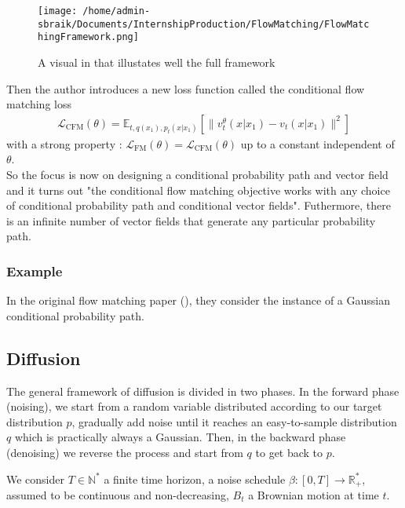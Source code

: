 \documentclass{article}
\begin{document}
\begin{figure}[h]
  \centering
  \texttt{[image: /home/admin-sbraik/Documents/InternshipProduction/FlowMatching/FlowMatchingFramework.png]}
  \caption{A visual in \cite{lipman2024flowmatchingguidecode} that illustates well the full framework}
  \label{fig:flow_matching_framework}
\end{figure}

Then the author introduces a new loss function called the conditional flow matching loss
\begin{align}
  \mathcal{L}_\text{CFM}(\theta) = \mathbb{E}_{t,q(x_1),p_t(x|x_1)}\left[\|v_t^\theta(x|x_1)-v_t(x|x_1)\|^2\right]
\end{align}
with a strong property : \(\mathcal{L}_\text{FM}(\theta)=\mathcal{L}_\text{CFM}(\theta)\) up to a constant independent of \(\theta\). \\
So the focus is now on designing a conditional probability path and vector field and it turns out "the conditional flow matching objective works with any choice of conditional probability path and conditional vector fields". Futhermore, there is an infinite number of vector fields that generate any particular probability path.\\



\subsubsection{Example}
In the original flow matching paper (\cite{lipman2023flowmatchinggenerativemodeling}), they consider the instance of a Gaussian conditional probability path.

\subsection{Diffusion}
The general framework of diffusion is divided in two phases. In the forward phase (noising), we start from a random variable distributed according to our target distribution \( p \), gradually add noise until it reaches an easy-to-sample distribution \(q\) which is practically always a Gaussian. Then, in the backward phase (denoising) we reverse the process and start from \(q\) to get back to \(p\). 

\bigskip

We consider \(T\in\mathbb{N}^{*}\) a finite time horizon, a noise schedule \(\beta:[0,T]\rightarrow \mathbb{R}_{+}^{*}\), assumed to be continuous and non-decreasing, \(B_t\) a Brownian motion at time \(t\).
\end{document}
